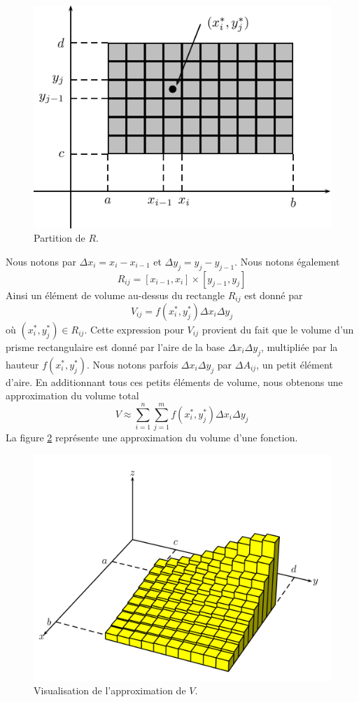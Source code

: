 \documentclass[]{book}
\theoremstyle{definition}
\theoremstyle{definition}
\theoremstyle{definition}
\theoremstyle{remark}
\begin{document}
\begin{figure}

{\centering \includegraphics[width=0.75\linewidth]{resources/images/latex/partitionR2} 

}

\caption{Partition de $R$.}\label{fig:partitionR2}
\end{figure}

Nous notons par \(\Delta x_i=x_i-x_{i-1}\) et
\(\Delta y_j=y_j-y_{j-1}\). Nous notons également
\[R_{ij}=[x_{i-1},x_i]\times[y_{j-1},y_j]\] Ainsi un élément de volume
au-dessus du rectangle \(R_{ij}\) est donné par
\[V_{ij}=f(x_i^*,y_j^*)\Delta x_i\Delta y_j\] où
\((x_i^*,y_j^*)\in R_{ij}\). Cette expression pour \(V_{ij}\) provient
du fait que le volume d'un prisme rectangulaire est donné par l'aire de
la base \(\Delta x_i\Delta y_j\), multipliée par la hauteur
\(f(x_i^*,y_j^*)\). Nous notons parfois \(\Delta x_i\Delta y_j\) par
\(\Delta A_{ij}\), un petit élément d'aire. En additionnant tous ces
petits éléments de volume, nous obtenons une approximation du volume
total
\[V\approx \sum_{i=1}^{n}\sum_{j=1}^m f(x_i^*,y_j^*)\Delta x_i\Delta y_j\]
La figure \ref{fig:volumeR2} représente une approximation du volume
d'une fonction.

\begin{figure}

{\centering \includegraphics[width=0.9\linewidth]{resources/images/latex/volumeR2} 

}

\caption{Visualisation de l'approximation de $V$.}\label{fig:volumeR2}
\end{figure}
\end{document}
